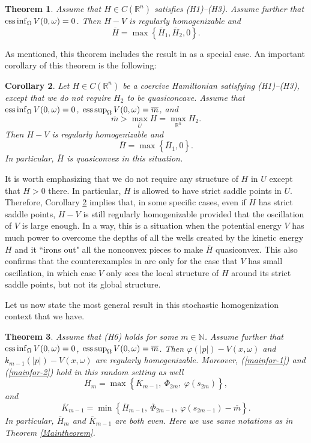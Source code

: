 \documentclass[12pt,reqno]{amsart}
\theoremstyle{plain}
\newtheorem{thm}{Theorem}[section]
\newtheorem{cor}[thm]{Corollary}
\theoremstyle{remark}
\numberwithin{equation}{section}
\newcommand{\N}{\mathbb{N}}
\newcommand{\R}{\mathbb{R}}
\newcommand{\om}{\omega}
\newcommand{\ol}{\overline}
\begin{document}
\begin{thm} \label{thm:random}
Assume that $H\in C(\R^n)$ satisfies {\rm (H1)--(H3)}.
Assume further that $ {\rm ess}\inf_{\Omega}V(0,\omega)=0$.
Then $H-V$ is regularly homogenizable and
\[
\ol{H} =\max\left\{ \ol{H}_1, \ol{H}_2,0\right\}.
\]
\end{thm}
As mentioned, this theorem includes the result in \cite{ATY1} as a special case.
An important corollary of this theorem is the following:
\begin{cor}\label{cor:random}   
Let $H\in C(\R^n)$ be a coercive Hamiltonian satisfying {\rm (H1)--(H3)}, 
except that we do not require $H_2$ to be quasiconcave.   
Assume  that  $ {\rm ess}\inf_{\Omega}V(0,\omega)=0$, $ {\rm ess}\sup_{\Omega}V(0,\omega)=\ol{m}$, and 
\[
\ol{m}>  \max_{\ol{U}}H=\max_{\R ^n}H_2.
\] 
Then $H-V$ is regularly homogenizable and
\[
\ol H=\max\left\{ \ol H_1,   0 \right\}.
\]
In particular,  $\ol H$ is quasiconvex in this situation. 
\end{cor}
It is worth emphasizing that
we do not require any structure of $H$ in $U$ except that $H>0$ there.
In particular, $H$ is allowed to have strict saddle points in $U$.
Therefore, Corollary \ref{cor:random} implies that, in some specific cases,
even if $H$ has strict saddle points, $H-V$ is still regularly homogenizable provided that 
the oscillation of $V$ is large enough.
In  a way, this is a situation when the potential energy $V$ has much power to overcome 
the depths of all the wells created by the kinetic energy $H$ and it ``irons out" all the nonconvex pieces
to make $\ol{H}$ quasiconvex.
This also confirms that the counterexamples in \cite{Zi,Fe-Sou} are only for the case that 
$V$ has small oscillation, in which case $V$ only sees the local structure of $H$ around its strict saddle points, 
but not its global structure.

Let us now state the most general result in this stochastic homogenization context that we have.

\begin{thm}\label{thm:random-m}  Assume that {\rm (H6)} holds for some $m\in \N$. 
Assume further  that  $ {\rm ess}\inf_{\Omega}V(0,\omega)=0$, $ {\rm ess}\sup_{\Omega}V(0,\omega)=\ol{m}$.
Then $\varphi(|p|) - V(x,\om)$ and $k_{m-1}(|p|)- V(x,\om)$ are regularly homogenizable. Moreover,  (\ref{mainfor-1}) and (\ref{mainfor-2}) hold in this random setting as well
\begin{equation*}
 \ol{H}_m=\max\left\{\ol{K}_{m-1}, \  \ol{\Phi}_{2m},\ \varphi(s_{2m})\right\},
\end{equation*}
and
\begin{equation*}
\ol{K}_{m-1}=\min\left\{\ol{H}_{m-1}, \  \ol{\Phi}_{2m-1},\ \varphi(s_{2m-1})-\ol{m}\right\}.
\end{equation*}
In particular,  $ \ol{H}_m$ and $ \ol{K}_{m-1}$ are both even.  Here we use same notations as in Theorem \ref{Maintheorem}. 
\end{thm}
\end{document}
